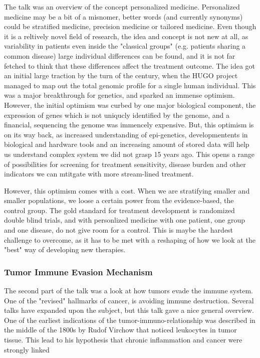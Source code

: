 \documentclass[12p]{article}
\begin{document}
The talk was an overview of the concept personalized medicine.
Personalized medicine may be a bit of a misnomer, better words (and currently synonyms) could be stratified medicine, precision medicine or tailored medicine.
Even though it is a reltively novel field of research, the idea and concept is not new at all, as variability in patients even inside the "classical groups" (e.g. patients sharing a common disease) large individual differences can be found, and it is not far fetched to think that these differences affect the treatment outcome.
The idea got an initial large traction by the turn of the century, when the HUGO project managed to map out the total genomic profile for a single human individual.
This was a major breakthrough for genetics, and sparked an immense optimism.
However, the initial optimism was curbed by one major biological component, the expression of genes which is not uniqucly identified by the genome, and a financial, sequencing the genome was immencely expensive.
But, this optimism is on its way back, as increased understanding of epi-genetics, developmentents in biological and hardware tools and an increasing amount of stored data will help us understand complex system we did not grasp 15 years ago.
This opens a range of possibilities for screening for treatment sensitivity, disease burden and other indicators we can mtitgate with more stream-lined treatment.

However, this optimism comes with a cost.
When we are stratifying smaller and smaller populations, we loose a certain power from the evidence-based, the control group.
The gold standard for treatment development is randomized double blind trials, and with personlized medicine with one patient, one group and one disease, do not give room for a control.
This is maybe the hardest challenge to overcome, as it has to be met with a reshaping of how we look at the "best" way of developing new therapies.

\subsubsection{Tumor Immune Evasion Mechanism}

The second part of the talk was a look at how tumors evade the immune system.
One of the "revised" hallmarks of cancer, is avoiding immune destruction.
Several talks have expanded upon the subject, but this talk gave a nice general overview.
One of the earliest indications of the tumor-immuno-relationship was described in the middle of the 1800s by Rudof Virchow that noticed leukocytes in tumor tissue.
This lead to his hypothesis that chronic inflammation and cancer were strongly linked 
\end{document}
